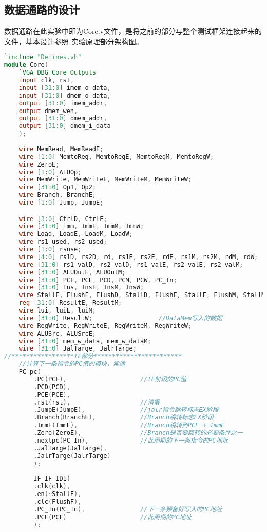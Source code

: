 \subsection{数据通路的设计}
数据通路在此实验中即为Core.v文件，是将之前的部分与整个测试框架连接起来的文件，基本设计参照
实验原理部分架构图。
\begin{lstlisting}[language = {verilog}]
`include "Defines.vh" 
module Core(
    `VGA_DBG_Core_Outputs
    input clk, rst,
    input [31:0] imem_o_data,
    input [31:0] dmem_o_data,
    output [31:0] imem_addr,
    output dmem_wen,
    output [31:0] dmem_addr,
    output [31:0] dmem_i_data
    );
    
    wire MemRead, MemReadE;  
    wire [1:0] MemtoReg, MemtoRegE, MemtoRegM, MemtoRegW;      
    wire ZeroE;               
    wire [1:0] ALUOp;
    wire MemWrite, MemWriteE, MemWriteM, MemWriteW;
    wire [31:0] Op1, Op2;
    wire Branch, BranchE;
    wire [1:0] Jump, JumpE;

    wire [3:0] CtrlD, CtrlE;
    wire [31:0] imm, ImmE, ImmM, ImmW;
    wire Load, LoadE, LoadM, LoadW;
    wire rs1_used, rs2_used;
    wire [1:0] rsuse;
    wire [4:0] rs1D, rs2D, rd, rs1E, rs2E, rdE, rs1M, rs2M, rdM, rdW;
    wire [31:0] rs1_valD, rs2_valD, rs1_valE, rs2_valE, rs2_valM;
    wire [31:0] ALUOutE, ALUOutM;
    wire [31:0] PCF, PCE, PCD, PCM, PCW, PC_In;
    wire [31:0] Ins, InsE, InsM, InsW;
    wire StallF, FlushF, FlushD, StallD, FlushE, StallE, FlushM, StallM, FlushW, StallW;
    reg [31:0] ResultE, ResultM;
    wire lui, luiE, luiM;
    wire [31:0] ResultW;                  //DataMem写入的数据
    wire RegWrite, RegWriteE, RegWriteM, RegWriteW;
    wire ALUSrc, ALUSrcE;
    wire [31:0] mem_w_data, mem_w_dataM;
    wire [31:0] JalTarge, JalrTarge;
//*****************IF部分************************    
    //计算下一条指令的PC值的模块，常通
    PC pc(
        .PC(PCF),                    //IF阶段的PC值   
        .PCD(PCD),
        .PCE(PCE),    
        .rst(rst),                   //清零
        .JumpE(JumpE),               //jalr指令跳转标志EX阶段
        .Branch(BranchE),            //Branch跳转标志EX阶段
        .ImmE(ImmE),                 //Branch跳转到PCE + ImmE 
        .Zero(ZeroE),                //Branch是否要跳转的必要条件之一
        .nextpc(PC_In),              //此周期的下一条指令的PC地址
        .JalTarge(JalTarge),
        .JalrTarge(JalrTarge)
        );   
        
        IF IF_ID1(
        .clk(clk),
        .en(~StallF),        
        .clc(FlushF),
        .PC_In(PC_In),               //下一条预备好写入的PC地址
        .PCF(PCF)                    //此周期的PC地址
        ); 
    

\end{lstlisting}
